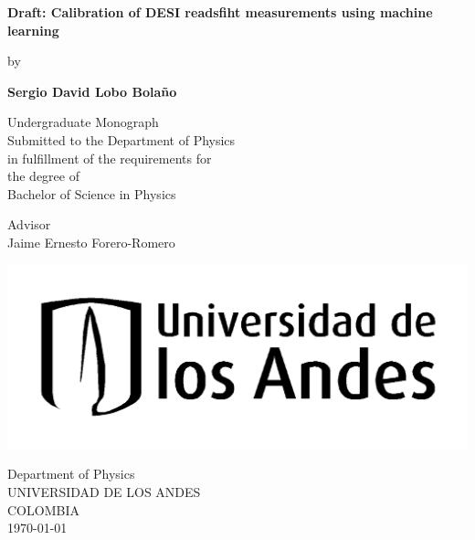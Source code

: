 \begin{titlepage}
    \begin{center}
        \vspace*{0.8 cm}
        
        \Large
        \textbf{Draft: Calibration of DESI readsfiht measurements using machine learning}
        
       by\\
        \large
        
        
        \vspace{1.0cm}
        
        \textbf{Sergio David Lobo Bolaño}
        
        \vspace{1.1 cm}
        \large
        Undergraduate Monograph \\
                \vspace{1cm}
        \normalsize 
        Submitted to the Department of Physics\\
         in fulfillment of the requirements for\\
       the degree of\\
       \vspace{0.4 cm}
       \LARGE
       Bachelor of Science in Physics\\
      
        \vspace{1cm}
        
        \normalsize
        Advisor\\
        \Large
        Jaime Ernesto Forero-Romero
        
        

\begin{center}
\includegraphics[width=0.4\linewidth]{TeX_files/universidaddelosandes}
\end{center}

                \vspace{2cm}
        \normalsize
        Department of Physics	\\
        UNIVERSIDAD DE LOS ANDES\\
        COLOMBIA\\
        \today
        
    \end{center}
\end{titlepage}